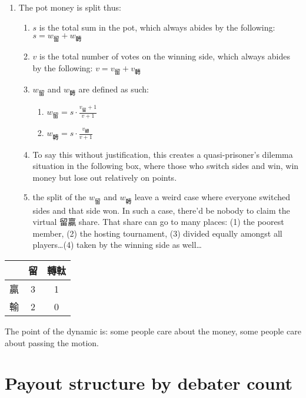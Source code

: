 \begin{enumerate}
    \item The pot money is split thus:
    \begin{enumerate}
        \item $s$ is the total sum in the pot, which always abides by the following: $s = w_{\text{留}} + w_{\text{轉}}$
        \item $v$ is the total number of votes on the winning side, which always abides by the following: $v = v_{\text{留}} + v_{\text{轉}}$
        \item $w_{\text{留}}$ and $w_{\text{轉}}$ are defined as such:
        \begin{enumerate}
            \item $w_{\text{留}} = s \cdot \frac{v_{\text{留}}+1}{v+1}$
            \item $w_{\text{轉}} = s \cdot \frac{v_{\text{轉}}}{v+1}$
        \end{enumerate}
        \item To say this without justification, this creates a quasi-prisoner's dilemma situation in the following box, where those who switch sides and win, win money but lose out relatively on points.
        \item the split of the $w_{\text{留}}$ and $w_{\text{轉}}$ leave a weird case where everyone switched sides and that side won. In such a case, there'd be nobody to claim the virtual 留贏 share. That share can go to many places: (1) the poorest member, (2) the hosting tournament, (3) divided equally amongst all players\ldots (4) taken by the winning side as well\ldots
    \end{enumerate}
\end{enumerate}

\begin{table}[h]
\centering
\begin{tabular}{l|cc}
\toprule
 & 留 & 轉軚 \\
\midrule
贏 & 3 & 1 \\
輸 & 2 & 0 \\
\bottomrule
\end{tabular}
\end{table}

The point of the dynamic is: some people care about the money, some people care about passing the motion.



\section{Payout structure by debater count}

